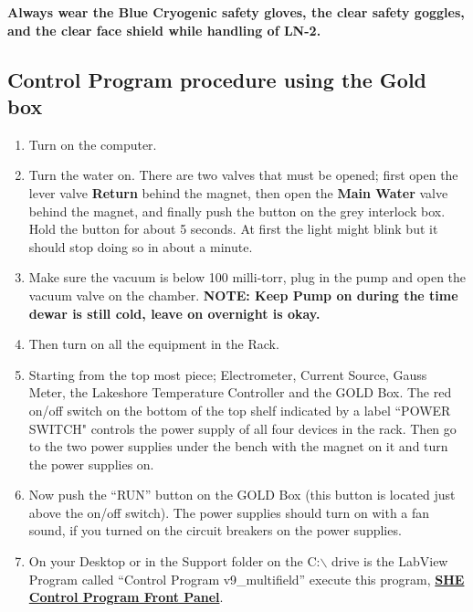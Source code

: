 \documentclass{../lab}
\begin{document}
\textbf{Always wear the Blue Cryogenic safety gloves, the clear safety goggles, and the clear face shield while handling of LN-2.}

\subsection{Control Program procedure using the Gold box}

\begin{enumerate}
    \item Turn on the computer.

    \item Turn the water on. There are two valves that must be opened; first open the lever valve \textbf{Return} behind the magnet, then open the \textbf{Main Water} valve behind the magnet, and finally push the button on the grey interlock box. Hold the button for about 5 seconds. At first the light might blink but it should stop doing so in about a minute.

    \item Make sure the vacuum is below 100 milli-torr, plug in the pump and open the vacuum valve on the chamber. \textbf{NOTE: Keep Pump on during the time dewar is still cold, leave on overnight is okay.}

    \item Then turn on all the equipment in the Rack.

    \item Starting from the top most piece; Electrometer, Current Source, Gauss Meter, the Lakeshore Temperature Controller and the GOLD Box. The red on/off switch on the bottom of the top shelf indicated by a label ``POWER SWITCH" controls the power supply of all four devices in the rack. Then go to the two power supplies under the bench with the magnet on it and turn the power supplies on.

    \item Now push the ``RUN'' button on the GOLD Box (this button is located just above the on/off switch). The power supplies should turn on with a fan sound, if you turned on the circuit breakers on the power supplies.

    \item On your Desktop or in the Support folder on the C:$\backslash$ drive is the LabView Program called ``Control Program v9\_multifield'' execute this program, \href{http://experimentationlab.berkeley.edu/sites/default/files/images/SHE\_FrontPanel.pdf}{\textbf{SHE Control Program Front Panel}}.


\end{enumerate}
\end{document}
